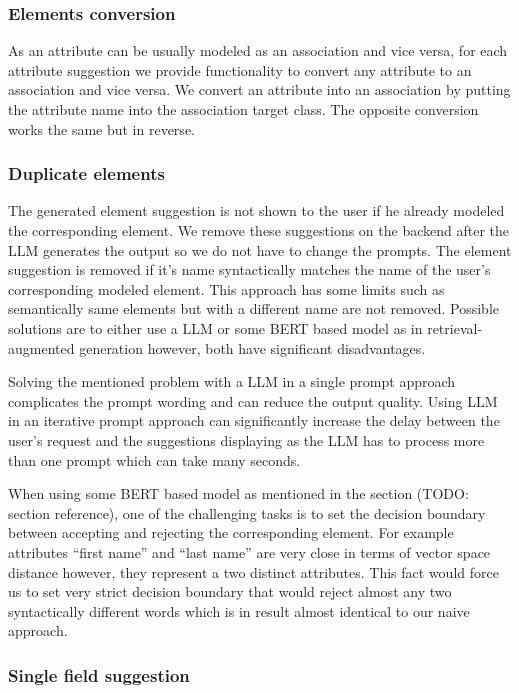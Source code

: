 \subsubsection{Elements conversion}
As an attribute can be usually modeled as an association and vice versa, for each attribute suggestion we provide functionality to convert any attribute to an association and vice versa. We convert an attribute into an association by putting the attribute name into the association target class. The opposite conversion works the same but in reverse.


\subsubsection{Duplicate elements}
The generated element suggestion is not shown to the user if he already modeled the corresponding element. We remove these suggestions on the backend after the LLM generates the output so we do not have to change the prompts. The element suggestion is removed if it's name syntactically matches the name of the user's corresponding modeled element. This approach has some limits such as semantically same elements but with a different name are not  removed. Possible solutions are to either use a LLM or some BERT based model as in retrieval-augmented generation however, both have significant disadvantages.

Solving the mentioned problem with a LLM in a single prompt approach complicates the prompt wording and can reduce the output quality. Using LLM in an iterative prompt approach can significantly increase the delay between the user's request and the suggestions displaying as the LLM has to process more than one prompt which can take many seconds.

When using some BERT based model as mentioned in the section (TODO: section reference), one of the challenging tasks is to set the decision boundary between accepting and rejecting the corresponding element. For example attributes ``first name'' and ``last name'' are very close in terms of vector space distance however, they represent a two distinct attributes. This fact would force us to set very strict decision boundary that would reject almost any two syntactically different words which is in result almost identical to our naive approach.


\subsubsection{Single field suggestion}


